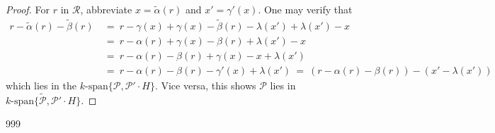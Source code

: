 \documentclass[11pt]{amsart}
\numberwithin{equation}{section}
\newcommand{\R}{\mathcal{R}}
\renewcommand{\P}{\mathcal{P}}
\renewcommand{\_}[1]{\mbox{$_{\left( #1 \right)}$}}
\begin{document}
{\begin{proof}
     
     For $r$ in $\R$, abbreviate $x=\tilde{\alpha}(r)$ and
     $x'=\gamma'(x)$.  One may verify that
     $$\begin{aligned}
       r-\tilde{\alpha}(r)-\tilde{\beta}(r)
             & \ = \ r
       -\gamma(x)
       +\gamma(x) 
       -\tilde{\beta}(r)-\lambda(x')+\lambda(x') -x
       \\
       & \ = \ r-\alpha(r) +\gamma(x) 
       -{\beta}(r)+\lambda(x') -x
       \\
       &\ = \ r-\alpha(r) 
       -{\beta}(r)+\gamma(x)-x+\lambda(x')
       \\
       & \ = \ r-\alpha(r) 
       -{\beta}(r)-\gamma'(x)+\lambda(x')
       \ = \ (r-\alpha(r) 
       -{\beta}(r))-(x'-\lambda(x') )\, 
     \end{aligned}
     $$
       which lies in the $k\text{-span}
     \{{\P}, 
     \P'\cdot H\}$.
     Vice versa, this shows
     ${\P}$ lies in $k\text{-span}
     \{\tilde{\P}, 
     \P'\cdot H\}$. 
    \end{proof}
    
\begin{thebibliography}{999}



  






\end{thebibliography}}
\end{document}
